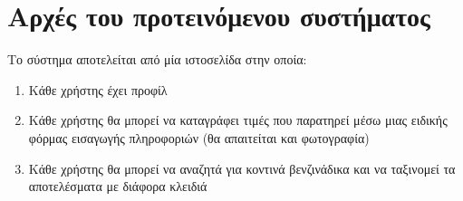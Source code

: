 \section{Αρχές του προτεινόμενου συστήματος}

Το σύστημα αποτελείται από μία ιστοσελίδα στην οποία:
\begin{enumerate}
	\item Κάθε χρήστης έχει προφίλ
	\item Κάθε χρήστης θα μπορεί να καταγράφει τιμές που παρατηρεί μέσω μιας ειδικής φόρμας εισαγωγής πληροφοριών (θα απαιτείται και φωτογραφία)
	\item Κάθε χρήστης θα μπορεί να αναζητά για κοντινά βενζινάδικα και να ταξινομεί τα αποτελέσματα με διάφορα κλειδιά
\end{enumerate}

